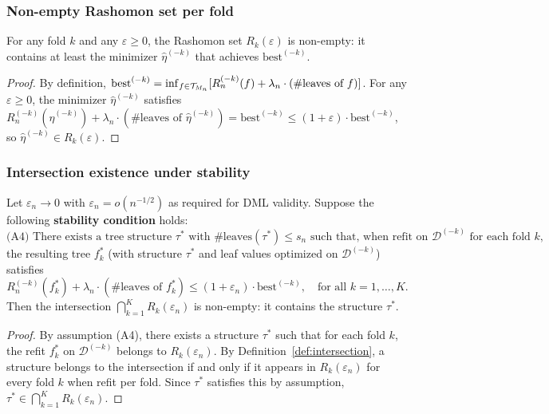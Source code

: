 \documentclass[12pt]{article}
\begin{document}
\subsubsection{Non-empty Rashomon set per fold}

\begin{lemma}
\label{lem:rashomon-nonempty}
For any fold $k$ and any $\varepsilon \ge 0$, the Rashomon set $R_k(\varepsilon)$ is non-empty: it contains at least the minimizer $\hat\eta^{(-k)}$ that achieves $\text{best}^{(-k)}$.
\end{lemma}
\begin{proof}
By definition, $\text{best}^{(-k)} = \inf_{f \in \mathcal{T}_{M_n}} [ R_n^{(-k)}(f) + \lambda_n \cdot (\#\text{leaves of } f) ]$. For any $\varepsilon \ge 0$, the minimizer $\hat\eta^{(-k)}$ satisfies $R_n^{(-k)}(\hat\eta^{(-k)}) + \lambda_n \cdot (\#\text{leaves of } \hat\eta^{(-k)}) = \text{best}^{(-k)} \le (1+\varepsilon) \cdot \text{best}^{(-k)}$, so $\hat\eta^{(-k)} \in R_k(\varepsilon)$.
\end{proof}

\subsubsection{Intersection existence under stability}

\begin{theorem}
\label{thm:intersection-existence}
Let $\varepsilon_n \to 0$ with $\varepsilon_n = o(n^{-1/2})$ as required for DML validity. Suppose the following \textbf{stability condition} holds:
\begin{equation}
\label{eq:stability}
\text{(A4) There exists a tree structure } \tau^* \text{ with } \#\text{leaves}(\tau^*) \le s_n \text{ such that, when refit on } \mathcal{D}^{(-k)} \text{ for each fold } k,
\end{equation}
the resulting tree $f_k^*$ (with structure $\tau^*$ and leaf values optimized on $\mathcal{D}^{(-k)}$) satisfies
\[
R_n^{(-k)}(f_k^*) + \lambda_n \cdot (\#\text{leaves of } f_k^*) \le (1+\varepsilon_n) \cdot \text{best}^{(-k)}, \quad \text{for all } k = 1, \ldots, K.
\]
Then the intersection $\bigcap_{k=1}^K R_k(\varepsilon_n)$ is non-empty: it contains the structure $\tau^*$.
\end{theorem}

\begin{proof}
By assumption (A4), there exists a structure $\tau^*$ such that for each fold $k$, the refit $f_k^*$ on $\mathcal{D}^{(-k)}$ belongs to $R_k(\varepsilon_n)$. By Definition~\ref{def:intersection}, a structure belongs to the intersection if and only if it appears in $R_k(\varepsilon_n)$ for every fold $k$ when refit per fold. Since $\tau^*$ satisfies this by assumption, $\tau^* \in \bigcap_{k=1}^K R_k(\varepsilon_n)$.
\end{proof}
\end{document}

